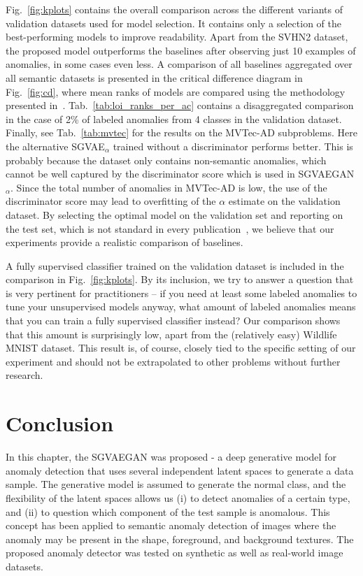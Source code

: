 Fig.~\ref{fig:kplots} contains the overall comparison across the different variants of validation datasets used for model selection. It contains only a selection of the best-performing models to improve readability. Apart from the SVHN2 dataset, the proposed model outperforms the baselines after observing just 10 examples of anomalies, in some cases even less. A comparison of all baselines aggregated over all semantic datasets is presented in the critical difference diagram in Fig.~\ref{fig:cd}, where mean ranks of models are compared using the methodology presented in~\cite{demsar2006statistical}. Tab.~\ref{tab:loi_ranks_per_ac} contains a disaggregated comparison in the case of 2\% of labeled anomalies from 4 classes in the validation dataset. Finally, see Tab.~\ref{tab:mvtec} for the results on the MVTec-AD subproblems. Here the alternative SGVAE$_{\alpha}$ trained without a discriminator performs better. This is probably because the dataset only contains non-semantic anomalies, which cannot be well captured by the discriminator score which is used in SGVAEGAN$_{\alpha}$. Since the total number of anomalies in MVTec-AD is low, the use of the discriminator score may lead to overfitting of the $\alpha$ estimate on the validation dataset. By selecting the optimal model on the validation set and reporting on the test set, which is not standard in every publication~\cite{vskvara2021comparison}, we believe that our experiments provide a realistic comparison of baselines.



A fully supervised classifier trained on the validation dataset is included in the comparison in Fig.~\ref{fig:kplots}. By its inclusion, we try to answer a question that is very pertinent for practitioners -- if you need at least some labeled anomalies to tune your unsupervised models anyway, what amount of labeled anomalies means that you can train a fully supervised classifier instead? Our comparison shows that this amount is surprisingly low, apart from the (relatively easy) Wildlife MNIST dataset. This result is, of course, closely tied to the specific setting of our experiment and should not be extrapolated to other problems without further research.

\section{Conclusion}
In this chapter, the SGVAEGAN was proposed - a deep generative model for anomaly detection that uses several independent latent spaces to generate a data sample. The generative model is assumed to generate the normal class, and the flexibility of the latent spaces allows us (i) to detect anomalies of a certain type, and (ii) to question which component of the test sample is anomalous. This concept has been applied to semantic anomaly detection of images where the anomaly may be present in the shape, foreground, and background textures. The proposed anomaly detector was tested on synthetic as well as real-world image datasets. 

